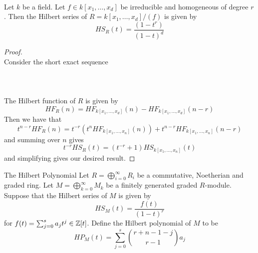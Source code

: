 \documentclass[a4paper]{article}
\begin{document}
\begin{eg}{}{}\\
Let $k$ be a field. Let $f\in k[x_1,\dots,x_d]$ be irreducible and homogeneous of degree $r$. Then the Hilbert series of $R=k[x_1,\dots,x_d]/(f)$ is given by $$HS_R(t)=\frac{(1-t^r)}{(1-t)^d}$$
\begin{proof}\\
Consider the short exact sequence \\~\\
 \\~\\
The Hilbert function of $R$ is given by $$HF_R(n)=HF_{k[x_1,\dots,x_d]}(n)-HF_{k[x_1,\dots,x_d]}(n-r)$$ Then we have that $$t^{n-r}HF_R(n)=t^{-r}(t^n HF_{k[x_1,\dots,x_n]}(n))+t^{n-r}HF_{k[x_1,\dots,x_n]}(n-r)$$ and summing over $n$ gives $$t^{-r}HS_R(t)=(t^{-r}+1)HS_{k[x_1,\dots,x_n]}(t)$$ and simplifying gives our desired result. 
\end{proof}
\end{eg}

\begin{defn}{The Hilbert Polynomial}{} Let $R=\bigoplus_{i=0}^\infty R_i$ be a commutative, Noetherian and graded ring. Let $M=\bigoplus_{k=0}^\infty M_k$ be a finitely generated graded $R$-module. Suppose that the Hilbert series of $M$ is given by $$HS_M(t)=\frac{f(t)}{(1-t)^r}$$ for $f(t)=\sum_{j=0}^sa_jt^j\in\mathbb{Z}[t]$. Define the Hilbert polynomial of $M$ to be $$HP_M(t)=\sum_{j=0}^s\binom{r+n-1-j}{r-1}a_j$$
\end{defn}
\end{document}
